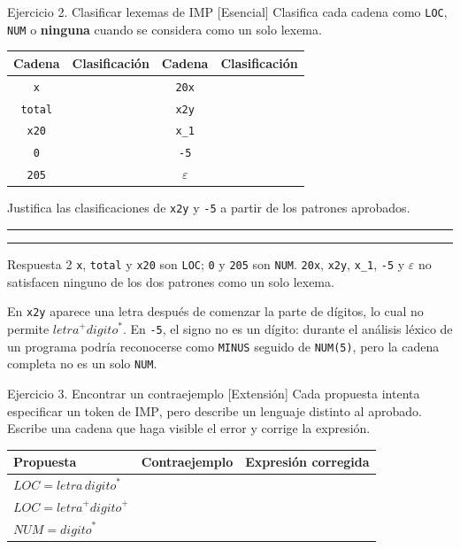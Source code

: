 \documentclass[11pt,spanish]{article}
\newcommand{\blank}[1][4cm]{\rule{#1}{0.4pt}}
\newcommand{\espaciosalida}{0.10cm}
\newcommand{\espaciosalida}{0.60cm}
\begin{document}
\begin{ejercicio}{Ejercicio 2. Clasificar lexemas de IMP \hfill {\small [Esencial]}}
Clasifica cada cadena como \texttt{LOC}, \texttt{NUM} o \textbf{ninguna} cuando se considera como un solo lexema.

\begin{center}
\small
\renewcommand{\arraystretch}{1.25}
\begin{tabular}{|c|c||c|c|}
\hline
\textbf{Cadena} & \textbf{Clasificación} & \textbf{Cadena} & \textbf{Clasificación} \tabularnewline
\hline
\texttt{x} & & \texttt{20x} & \tabularnewline[\espaciosalida]
\hline
\texttt{total} & & \texttt{x2y} & \tabularnewline[\espaciosalida]
\hline
\texttt{x20} & & \texttt{x\_1} & \tabularnewline[\espaciosalida]
\hline
\texttt{0} & & \texttt{-5} & \tabularnewline[\espaciosalida]
\hline
\texttt{205} & & \(\varepsilon\) & \tabularnewline[\espaciosalida]
\hline
\end{tabular}
\end{center}

Justifica las clasificaciones de \texttt{x2y} y \texttt{-5} a partir de los patrones aprobados.

\ifrespuestas\else
\blank[14cm]

\blank[14cm]
\fi
\end{ejercicio}

\ifrespuestas
\begin{respuesta}{Respuesta 2}
\texttt{x}, \texttt{total} y \texttt{x20} son \texttt{LOC}; \texttt{0} y \texttt{205} son \texttt{NUM}. \texttt{20x}, \texttt{x2y}, \texttt{x\_1}, \texttt{-5} y \(\varepsilon\) no satisfacen ninguno de los dos patrones como un solo lexema.

En \texttt{x2y} aparece una letra después de comenzar la parte de dígitos, lo cual no permite \(\mathit{letra}^{+}\mathit{digito}^{*}\). En \texttt{-5}, el signo no es un dígito: durante el análisis léxico de un programa podría reconocerse como \texttt{MINUS} seguido de \texttt{NUM(5)}, pero la cadena completa no es un solo \texttt{NUM}.
\end{respuesta}
\fi

\begin{ejercicio}{Ejercicio 3. Encontrar un contraejemplo \hfill {\small [Extensión]}}
Cada propuesta intenta especificar un token de \textsc{IMP}, pero describe un lenguaje distinto al aprobado. Escribe una cadena que haga visible el error y corrige la expresión.

\begin{center}
\small
\renewcommand{\arraystretch}{1.35}
\begin{tabular}{|p{}|p{}|p{}|}
\hline
\textbf{Propuesta} & \textbf{Contraejemplo} & \textbf{Expresión corregida} \tabularnewline
\hline
\(\mathit{LOC}=\mathit{letra}\,\mathit{digito}^{*}\) & & \tabularnewline[0.9cm]
\hline
\(\mathit{LOC}=\mathit{letra}^{+}\mathit{digito}^{+}\) & & \tabularnewline[0.9cm]
\hline
\(\mathit{NUM}=\mathit{digito}^{*}\) & & \tabularnewline[0.9cm]
\hline
\end{tabular}
\end{center}
\end{ejercicio}
\end{document}
